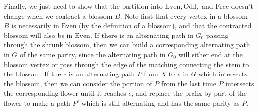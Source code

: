 \documentclass[12pt]{article}
\begin{document}
\begin{enumerate}
Finally, we just need to show that the partition into $\mbox{Even}, \mbox{Odd},$ and $\mbox{Free}$ doesn't change when we contract a blossom $B$. Note first that every vertex in a blossom $B$ is necessarily in $\mbox{Even}$ (by the definition of a blossom), and that the contracted blossom will also be in $\mbox{Even}$. If there is an alternating path in $G_0$ passing through the shrunk blossom, then we can build a corresponding alternating path in $G$ of the same parity, since the alternating path in $G_0$ will either end at the blossom vertex or pass through the edge of the matching connecting the stem to the blossom. If there is an alternating path $P$ from $X$ to $v$ in $G$ which intersects the blossom, then we can consider the portion of $P$ from the last time $P$ intersects the corresponding flower until it reaches $v$, and replace the prefix by part of the flower to make a path $P'$ which is still alternating and has the same parity as $P$.



\end{enumerate}
\end{document}
